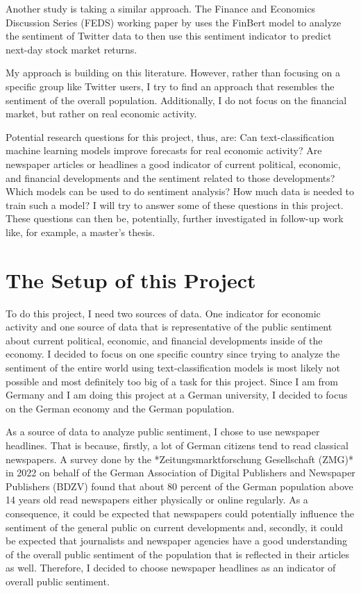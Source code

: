 \documentclass[11pt, a4paper, leqno]{article}
\begin{document}
Another study is taking a similar approach. The Finance and Economics Discussion Series (FEDS) working paper by \textcite{Adams_2023} uses the FinBert model to analyze the sentiment of Twitter data to then use this sentiment indicator to predict next-day stock market returns.

My approach is building on this literature. However, rather than focusing on a specific group like Twitter users, I try to find an approach that resembles the sentiment of the overall population. Additionally, I do not focus on the financial market, but rather on real economic activity.

Potential research questions for this project, thus, are: Can text-classification machine learning models improve forecasts for real economic activity? Are newspaper articles or headlines a good indicator of current political, economic, and financial developments and the sentiment related to those developments? Which models can be used to do sentiment analysis? How much data is needed to train such a model?
I will try to answer some of these questions in this project. These questions can then be, potentially, further investigated in follow-up work like, for example, a master's thesis.

\section{The Setup of this Project}

To do this project, I need two sources of data. One indicator for economic activity and one source of data that is representative of the public sentiment about current political, economic, and financial developments inside of the economy. I decided to focus on one specific country since trying to analyze the sentiment of the entire world using text-classification models is most likely not possible and most definitely too big of a task for this project. Since I am from Germany and I am doing this project at a German university, I decided to focus on the German economy and the German population. 

As a source of data to analyze public sentiment, I chose to use newspaper headlines. That is because, firstly, a lot of German citizens tend to read classical newspapers. A survey done by the *Zeitungsmarktforschung Gesellschaft (ZMG)* in 2022 on behalf of the German Association of Digital Publishers and Newspaper Publishers (BDZV) found that about 80 percent of the German population above 14 years old read newspapers either physically or online regularly. As a consequence, it could be expected that newspapers could potentially influence the sentiment of the general public on current developments and, secondly, it could be expected that journalists and newspaper agencies have a good understanding of the overall public sentiment of the population that is reflected in their articles as well. Therefore, I decided to choose newspaper headlines as an indicator of overall public sentiment.
\end{document}
